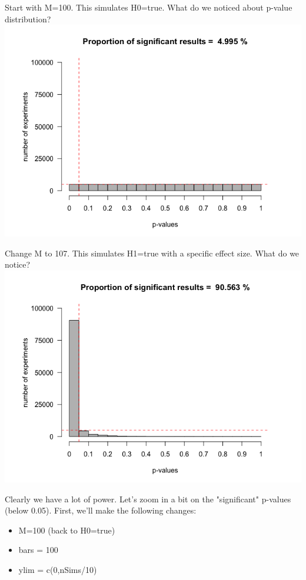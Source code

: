 \documentclass[11pt]{article}
\begin{document}
Start with M=100.  This simulates H0=true.  What do we noticed about p-value distribution?
\includegraphics[width=.9\linewidth]{figures/lindley1.png}

Change M to 107.  This simulates H1=true with a specific effect size.  What do we notice?
\includegraphics[width=.9\linewidth]{figures/lindley2.png}

Clearly we have a lot of power.  Let's zoom in a bit on the "significant" p-values (below 0.05).  First, we'll make the following changes:
\begin{itemize}
\item M=100 (back to H0=true)
\item bars = 100
\item ylim = c(0,nSims/10)
\end{itemize}
\end{document}
